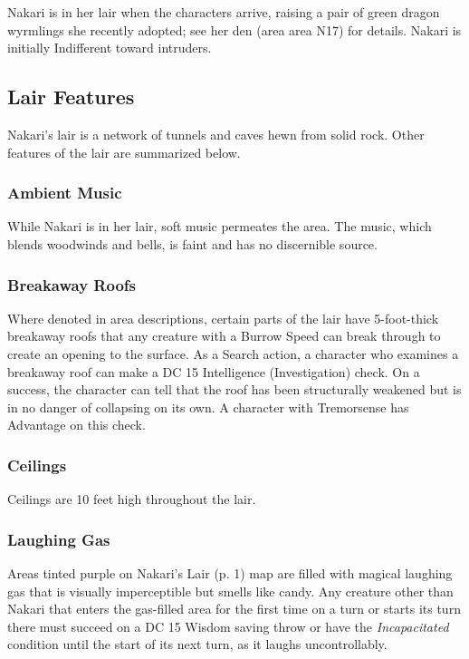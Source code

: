 \documentclass[letterpaper, 11pt, twocolumn]{dndbook}
\begin{document}
Nakari is in her lair when the characters arrive, raising a pair of green dragon wyrmlings she recently adopted; see her den (area area N17) for details. Nakari is initially Indifferent toward intruders.

\subsection{Lair Features}

Nakari's lair is a network of tunnels and caves hewn from solid rock. Other features of the lair are summarized below.

\subsubsection{Ambient Music}

While Nakari is in her lair, soft music permeates the area. The music, which blends woodwinds and bells, is faint and has no discernible source.

\subsubsection{Breakaway Roofs}

Where denoted in area descriptions, certain parts of the lair have 5-foot-thick breakaway roofs that any creature with a Burrow Speed can break through to create an opening to the surface. As a Search action, a character who examines a breakaway roof can make a DC 15 Intelligence (Investigation) check. On a success, the character can tell that the roof has been structurally weakened but is in no danger of collapsing on its own. A character with Tremorsense has Advantage on this check.

\subsubsection{Ceilings}

Ceilings are 10 feet high throughout the lair.

\subsubsection{Laughing Gas}

Areas tinted purple on Nakari's Lair (p. 1) map are filled with magical laughing gas that is visually imperceptible but smells like candy. Any creature other than Nakari that enters the gas-filled area for the first time on a turn or starts its turn there must succeed on a DC 15 Wisdom saving throw or have the \textit{Incapacitated} condition until the start of its next turn, as it laughs uncontrollably.
\end{document}
